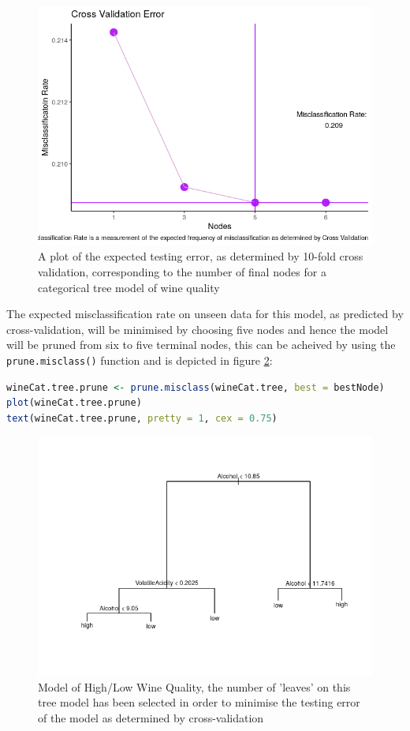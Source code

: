 \documentclass[
]{article}
\newcommand{\passthrough}[1]{#1}
\begin{document}
\begin{figure}[h]
	\centering
	\includegraphics[width=0.7\linewidth]{SecAssignment_files/figure-html/unnamed-chunk-40-1.png}
	\caption{A plot of the expected testing error, as determined by 10-fold cross validation, corresponding to the number of final nodes for a categorical tree model of wine quality}
	\label{cvtreeclass}
\end{figure}


The expected misclassification rate on unseen data for this model, as
predicted by cross-validation, will be minimised by choosing five nodes and hence the model will be pruned from six to five terminal nodes, this
can be acheived by using the \passthrough{\lstinline!prune.misclass()!}
function and is depicted in figure \ref{treecatwine}:

\begin{lstlisting}[language=R]
wineCat.tree.prune <- prune.misclass(wineCat.tree, best = bestNode)
plot(wineCat.tree.prune)
text(wineCat.tree.prune, pretty = 1, cex = 0.75)
\end{lstlisting}

\begin{figure}[h!]
	\centering
	\includegraphics[width=0.7\linewidth]{SecAssignment_files/figure-html/unnamed-chunk-41-1.png}
	\caption{Model of High/Low Wine Quality, the number of 'leaves' on this tree model has been selected in order to minimise the testing error of the model as determined by cross-validation}
	\label{treecatwine}
\end{figure}
\end{document}

